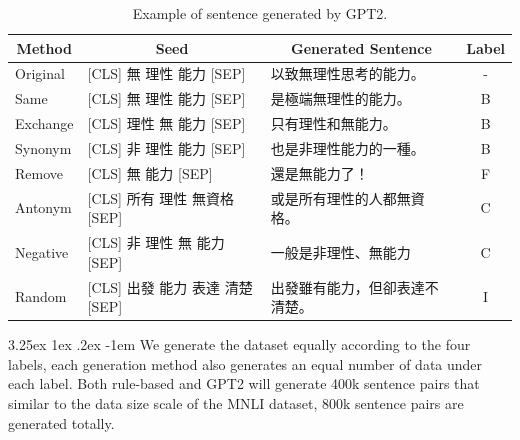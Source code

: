 \documentclass[12pt]{article}
\makeatletter
\renewcommand\paragraph{\@startsection{paragraph}{5}{\z@}%
  {3.25ex \@plus1ex \@minus.2ex}%
  {-1em}%
  {\normalfont\normalsize\bfseries}}
\makeatother
\begin{document}
\begin{CJK*}{UTF8}{bkai}
\begin{spacing}{1.77}
\begin{table}[H]
  \centering
  \setlength{\extrarowheight}{-3pt}
  \begin{tabular}{|l|l|l|c|}
  \hline
  \multicolumn{1}{|c|}{Method} & \multicolumn{1}{c|}{Seed} & \multicolumn{1}{c|}{Generated Sentence} & Label \\ \hline
  Original & {[}CLS{]} 無 理性 能力 {[}SEP{]} & 以致無理性思考的能力。 & - \\ \hline
  Same & {[}CLS{]} 無 理性 能力 {[}SEP{]} & 是極端無理性的能力。 & B \\ \hline
  Exchange & {[}CLS{]} 理性 無 能力 {[}SEP{]} & 只有理性和無能力。 & B \\ \hline
  Synonym & {[}CLS{]} 非 理性 能力 {[}SEP{]} & 也是非理性能力的一種。 & B \\ \hline
  Remove & {[}CLS{]} 無 能力 {[}SEP{]} & 還是無能力了！ & F \\ \hline
  Antonym & {[}CLS{]} 所有 理性 無資格 {[}SEP{]} & 或是所有理性的人都無資格。 & C \\ \hline
  Negative & {[}CLS{]} 非 理性 無 能力 {[}SEP{]} & 一般是非理性、無能力 & C \\ \hline
  Random & {[}CLS{]} 出發 能力 表達 清楚 {[}SEP{]} & 出發雖有能力，但卻表達不清楚。 & I \\ \hline
  \end{tabular}
  \caption{Example of sentence generated by GPT2.}
  \label{example:gpt2_pseudo}
\end{table}

\paragraph{}
We generate the dataset equally according to the four labels, each generation method also generates an equal number of data under each label. Both rule-based and GPT2 will generate 400k sentence pairs that similar to the data size scale of the MNLI dataset, 800k sentence pairs are generated totally.


\end{spacing}
\end{CJK*}
\end{document}
